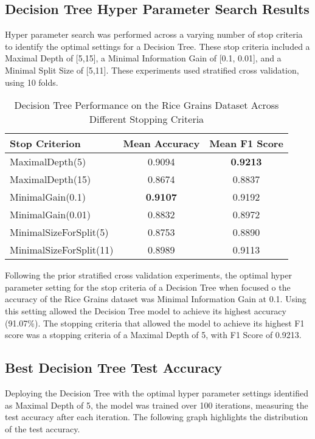 \documentclass[letterpaper]{article}
\begin{document}
\subsection{Decision Tree Hyper Parameter Search Results}

    Hyper parameter search was performed across a varying number of stop criteria to identify the optimal settings for a Decision Tree. These stop criteria included a Maximal Depth of [5,15], a Minimal Information Gain of [0.1, 0.01], and a Minimal Split Size of [5,11].   
    These experiments used stratified cross validation, using 10 folds.


\begin{table}[h]
\centering
\begin{tabular}{|l|c|c|}
\hline
\textbf{Stop Criterion} & \textbf{Mean Accuracy} & \textbf{Mean F1 Score} \\
\hline
MaximalDepth(5)    & 0.9094 & \textbf{0.9213} \\
MaximalDepth(15)            & 0.8674 & 0.8837 \\
MinimalGain(0.1)            & \textbf{0.9107} & 0.9192 \\
MinimalGain(0.01)           & 0.8832 & 0.8972 \\
MinimalSizeForSplit(5)      & 0.8753 & 0.8890 \\
MinimalSizeForSplit(11)     & 0.8989 & 0.9113 \\
\hline
\end{tabular}
\caption{Decision Tree Performance on the Rice Grains Dataset Across Different Stopping Criteria}
\label{tab:dt_rice_results}
\end{table}

Following the prior stratified cross validation experiments, the optimal hyper parameter setting for the stop criteria of a Decision Tree when focused o the accuracy of the Rice Grains dataset was Minimal Information Gain at 0.1. Using this setting allowed the Decision Tree model to achieve its highest accuracy (91.07\%). The stopping criteria that allowed the model to achieve its highest F1 score was a stopping criteria of a Maximal Depth of 5, with F1 Score of 0.9213.

\subsection*{Best Decision Tree Test Accuracy}

Deploying the Decision Tree with the optimal hyper parameter settings identified as Maximal Depth of 5, the model was trained over 100 iterations, measuring the test accuracy after each iteration. The following graph highlights the distribution of the test accuracy.
\end{document}
